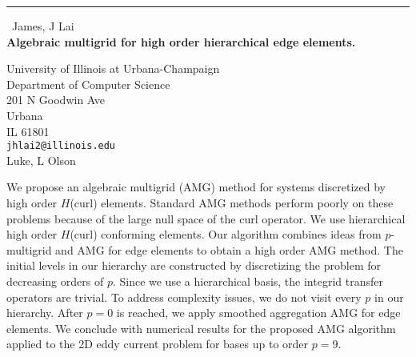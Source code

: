 \documentclass{report}
\begin{document}
\begin{center}
\rule{6in}{1pt} \
{\large James, J Lai \\
{\bf Algebraic multigrid for high order hierarchical edge elements.}}

University of Illinois at Urbana-Champaign \\ Department of Computer Science \\ 201 N Goodwin Ave \\ Urbana \\ IL 61801
\\
{\tt jhlai2@illinois.edu}\\
Luke, L Olson\end{center}

We propose an algebraic multigrid (AMG) method for systems discretized by
high order $H$(curl) elements. Standard AMG methods perform poorly on
these problems because of the large null space of the curl operator. We
use hierarchical high order $H$(curl) conforming elements. Our algorithm
combines ideas from $p$-multigrid and AMG for edge elements to obtain a
high order AMG method. The initial levels in our hierarchy are
constructed by discretizing the problem for decreasing orders of $p$.
Since we use a hierarchical basis, the integrid transfer operators are
trivial. To address complexity issues, we do not visit every $p$ in our
hierarchy. After $p=0$ is reached, we apply smoothed aggregation AMG for
edge elements. We conclude with numerical results for the proposed AMG
algorithm applied to the 2D eddy current problem for bases up to order
$p=9$.
\end{document}
